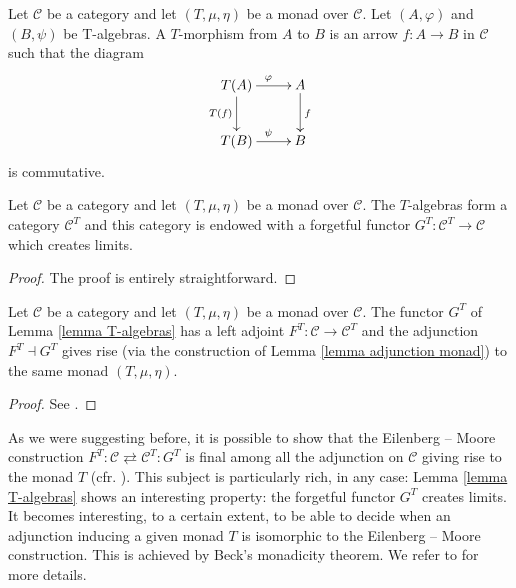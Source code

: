 \begin{refsection}
\begin{defin}
Let $\mathcal C$ be a category and let $(T, \mu, \eta)$ be a monad over $\mathcal C$. Let $(A,\varphi)$ and $(B,\psi)$ be T-algebras. A $T$-morphism from $A$ to $B$ is an arrow $f \colon A \to B$ in $\mathcal C$ such that the diagram
\[
\xymatrix{
T(A) \ar[d]_{T(f)} \ar[r]^{\varphi} & A \ar[d]^f \\ T(B) \ar[r]^{\psi} & B
}
\]
is commutative.
\end{defin}

\begin{lemma} \label{lemma T-algebras}
Let $\mathcal C$ be a category and let $(T,\mu,\eta)$ be a monad over $\mathcal C$. The $T$-algebras form a category $\mathcal C^T$ and this category is endowed with a forgetful functor $G^T \colon \mathcal C^T \to \mathcal C$ which creates limits.
\end{lemma}

\begin{proof}
The proof is entirely straightforward.
\end{proof}

\begin{thm} \label{thm Eilenberg-Moore}
Let $\mathcal C$ be a category and let $(T,\mu,\eta)$ be a monad over $\mathcal C$. The functor $G^T$ of Lemma \ref{lemma T-algebras} has a left adjoint $F^T \colon \mathcal C \to \mathcal C^T$ and the adjunction $F^T \dashv G^T$ gives rise (via the construction of Lemma \ref{lemma adjunction monad}) to the same monad $(T,\mu,\eta)$.
\end{thm}

\begin{proof}
See \cite[Thm. VI.2.1]{cwm}.
\end{proof}

\begin{rmk}
As we were suggesting before, it is possible to show that the Eilenberg -- Moore construction $F^T \colon \mathcal C \rightleftarrows \mathcal C^T \colon G^T$ is final among all the adjunction on $\mathcal C$ giving rise to the monad $T$ (cfr. \cite[Thm VI.3.1]{cwm}). This subject is particularly rich, in any case: Lemma \ref{lemma T-algebras} shows an interesting property: the forgetful functor $G^T$ creates limits. It becomes interesting, to a certain extent, to be able to decide when an adjunction inducing a given monad $T$ is isomorphic to the Eilenberg -- Moore construction. This is achieved by Beck's monadicity theorem. We refer to \cite[Ch. VI.7]{cwm} for more details.
\end{rmk}


\end{refsection}
